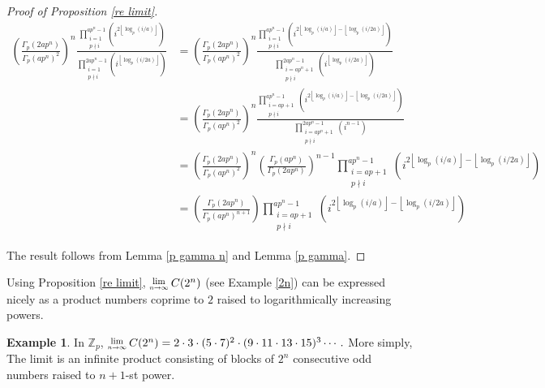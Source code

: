 \documentclass[12pt, letter]{article}    %
\theoremstyle{plain}
\theoremstyle{definition}
\newtheorem{example}[theorem]{Example}
\numberwithin{equation}{section}
\newcommand{\Lim}[1]{\raisebox{0.5ex}{\scalebox{0.8}{$\displaystyle \lim_{#1}\;$}}}
\newcommand{\lemref}[1]{Lemma \ref{#1}}
\newcommand{\propref}[1]{Proposition \ref{#1}}
\newcommand{\exref}[1]{Example \ref{#1}}
\providecommand{\floor}[1]{\left \lfloor #1 \right \rfloor }
\begin{document}
\begin{proof}[Proof of \propref{re limit}]
\begin{align*}
\left(\frac{ \Gamma_p (2ap^n)}{ \Gamma_p (ap^n)^2}\right)^n\frac{\prod\limits_{\substack{i=1 \\ p \nmid i}}^{ap^n-1}\left(i^{2\floor{\log_p(i/a)}}\right)}{\prod\limits_{\substack{i=1 \\ p \nmid i}}^{2ap^n-1}\left(i^{\floor{\log_p(i/2a)}}\right)} 
&=\left(\frac{ \Gamma_p (2ap^n)}{ \Gamma_p (ap^n)^2}\right)^n\frac{ \prod\limits_{\substack{i=1 \\ p \nmid i}}^{ap^n-1}\left(i^{2\floor{\log_p(i/a)}-\floor{\log_p(i/2a)}}\right)}{ \prod\limits_{\substack{i=ap^n+1 \\ p \nmid i }}^{2ap^n-1}\left(i^{\floor{\log_p(i/2a)}}\right)}\\ 
 &=\left(\frac{ \Gamma_p (2ap^n)}{ \Gamma_p (ap^n)^2}\right)^n\frac{ \prod\limits_{\substack{i=ap+1 \\ p \nmid i }}^{ap^n-1}\left(i^{2\floor{\log_p(i/a)}-\floor{\log_p(i/2a)}}\right)}{\prod\limits_{\substack{i=ap^n+1 \\ p \nmid i }}^{2ap^n-1}\left(i^{n-1}\right)}\\ 
&=\left(\frac{ \Gamma_p (2ap^n)}{ \Gamma_p (ap^n)^2}\right)^n\left(\frac{\Gamma_p(ap^n)}{\Gamma_p(2ap^n)}\right)^{n-1}\prod\limits_{\substack{i=ap+1 \\ p \nmid i }}^{ap^n-1}\left(i^{2\floor{\log_p(i/a)}-\floor{\log_p(i/2a)}}\right)\\
 &=\left(\frac{ \Gamma_p (2ap^n)}{ \Gamma_p (ap^n)^{n+1}}\right)\prod\limits_{\substack{i=ap+1 \\ p \nmid i }}^{ap^n-1}\left(i^{2\floor{\log_p(i/a)}-\floor{\log_p(i/2a)}}\right)
\end{align*}

The result follows from \lemref{p gamma n} and \lemref{p gamma}.\end{proof}

Using \propref{re limit}, $\Lim{n\rightarrow\infty}C(2^n)$ (see \exref{2n}) can be expressed nicely as a product numbers coprime to $2$ raised to logarithmically increasing powers. 

\begin{example}
In $\mathbb{Z}_p$, $\Lim{n\rightarrow\infty}C(2^n)=2\cdot3\cdot(5\cdot7)^2\cdot(9\cdot11\cdot13\cdot15)^3\cdots.$ More simply, The limit is an infinite product consisting of blocks of $2^n$ consecutive odd numbers raised to $n+1$-st power.
\end{example}
\end{document}
